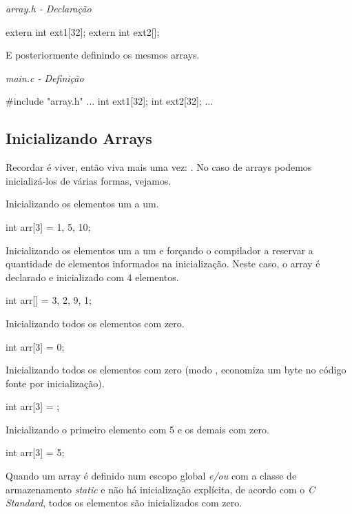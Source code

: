 \textit{array.h - Declaração}\\
\begin{ccode}
  extern int ext1[32];
  extern int ext2[];
\end{ccode}

E posteriormente definindo os mesmos arrays.

\textit{main.c - Definição}\\
\begin{ccode}
  #include "array.h"
  ...
  int ext1[32];
  int ext2[32];
  ...
\end{ccode}

\subsection{Inicializando Arrays}
Recordar é viver, então viva mais uma vez: . No caso de arrays podemos inicializá-los de várias
formas, vejamos.

Inicializando os elementos um a um.

\begin{ccode}
  int arr[3] = {1, 5, 10};
\end{ccode}

Inicializando os elementos um a um e forçando o compilador a reservar a
quantidade de elementos informados na inicialização. Neste caso, o array é
declarado e inicializado com 4 elementos.

\begin{ccode}
  int arr[] = {3, 2, 9, 1};
\end{ccode}

Inicializando todos os elementos com zero.

\begin{ccode}
  int arr[3] = {0};
\end{ccode}

Inicializando todos os elementos com zero (modo ,
economiza um byte no código fonte por inicialização).

\begin{ccode}
  int arr[3] = {};
\end{ccode}

Inicializando o primeiro elemento com 5 e os demais com zero.

\begin{ccode}
  int arr[3] = {5};
\end{ccode}

Quando um array é definido num escopo global \textit{e/ou} com a classe de
armazenamento \textit{static} e não há inicialização explícita, de acordo com o
\textit{C Standard}, todos os elementos são inicializados com zero.

